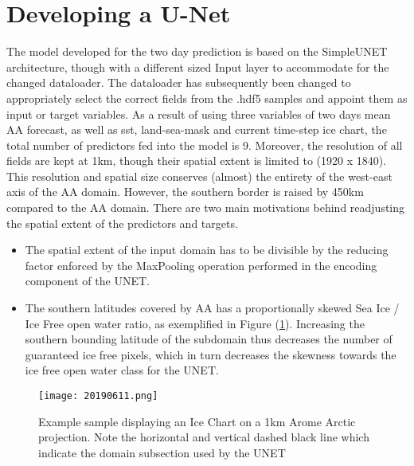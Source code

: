 \documentclass[../main/thesis]{subfiles}
\begin{document}

\section{Developing a U-Net}
\label{sec:developing a unet}

The model developed for the two day prediction is based on the SimpleUNET architecture, though with a different sized Input layer to accommodate for the changed dataloader. The dataloader has subsequently been changed to appropriately select the correct fields from the .hdf5 samples and appoint them as input or target variables. As a result of using three variables of two days mean AA forecast, as well as sst, land-sea-mask and current time-step ice chart, the total number of predictors fed into the model is 9. Moreover, the resolution of all fields are kept at 1km, though their spatial extent is limited to (1920 x 1840). This resolution and spatial size conserves (almost) the entirety of the west-east axis of the AA domain. However, the southern border is raised by 450km compared to the AA domain. There are two main motivations behind readjusting the spatial extent of the predictors and targets.

\begin{itemize}
    \item[1.] The spatial extent of the input domain has to be divisible by the reducing factor enforced by the MaxPooling operation performed in the encoding component of the UNET.
    \item[2.] The southern latitudes covered by AA has a proportionally skewed Sea Ice / Ice Free open water ratio, as exemplified in Figure (\ref{fig:exampleAAsouthborder}). Increasing the southern bounding latitude of the subdomain thus decreases the number of guaranteed ice free pixels, which in turn decreases the skewness towards the ice free open water class for the UNET.
\end{itemize}

\begin{figure}
    \texttt{[image: 20190611.png]}
    \caption{\label{fig:exampleAAsouthborder}Example sample displaying an Ice Chart on a 1km Arome Arctic projection. Note the horizontal and vertical dashed black line which indicate the domain subsection used by the UNET}
\end{figure}
\end{document}
